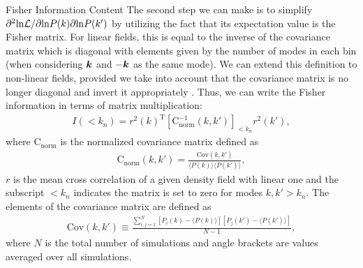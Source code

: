 \begin{section}{Fisher Information Content}
  The second step we can make is to simplify
  $\partial ^2 \mathrm{ln \mathcal{L}}/\partial \mathrm{ln} P(k) \partial
  \mathrm{ln} P(k')$
  by utilizing the fact that its expectation value is the Fisher
  matrix.  For linear fields, this is equal to the inverse of the
  covariance matrix which is diagonal with elements given by the
  number of modes in each bin (when considering $\boldsymbol{k}$ and $-\boldsymbol{k}$ as the same mode).  
  We can extend this definition to
  non-linear fields, provided we take into account that the covariance
  matrix is no longer diagonal and invert it appropriately \cite{bib:Rimes2006}.  Thus, we
  can write the Fisher information in terms of matrix multiplication:
  \begin{align}
    I \left( < k_n\right) = r^2(k)^{\mathrm{T}} \left[ \mathrm{C^{-1}_{norm}} 
    ( k,k' )\right]_{<k_n} r^2(k') ,
    \label{eq:fisherformulaused}
  \end{align}
  where $\mathrm{C_{norm}}$ is the normalized covariance matrix
  defined as
  \begin{align}
    \mathrm{C_{norm}} \left( k,k' \right)=\frac{\mathrm{Cov}(k,k')}
    {\langle P(k)\rangle\langle P(k')\rangle},
  \end{align}
  $r$ is the mean cross correlation of a given density field with
  linear one and the subscript $<k_n$ indicates the matrix is set to
  zero for modes $k,k'>k_n$.  The elements of the covariance matrix are defined as
  \begin{align}
    \mathrm{Cov}\left(k,k'\right)\equiv \frac{\sum_{i,j=1}^{N}\left[ P_i \left( k \right) - 
    \langle P \left( k \right) \rangle \right]\left[ P_j \left( k' \right) - 
    \langle P \left( k' \right)\rangle \right]}{N-1},
  \end{align}
  where $N$ is the total number of simulations and angle brackets are
  values averaged over all simulations.  


\end{section}
